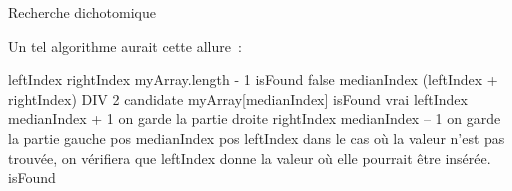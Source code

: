 \begin{Fiche}{Recherche dichotomique}
\begin{itemize}
		\end{itemize}

		Un tel algorithme aurait cette allure~:
	
		\begin{pseudocode}
				\Empty
				\Let leftIndex 
				\Let rightIndex \Gets myArray.length - 1
				\Let isFound \Gets false
				\Empty
					\Let medianIndex \Gets (leftIndex + rightIndex) DIV 2
					\Let candidate \Gets myArray[medianIndex]
						\Let isFound \Gets vrai
						\Let leftIndex \Gets medianIndex + 1
						\RComment on garde la partie droite
					\Else
						\Let rightIndex \Gets medianIndex – 1
						\RComment on garde la partie gauche
					\EndIf
				\EndWhile
				\Empty
					\Let pos \Gets medianIndex
				\Else
					\Let pos \Gets leftIndex
					\RComment dans le cas où la valeur n’est pas trouvée,
					\Empty 
					\RComment on vérifiera que leftIndex donne la valeur 
					où elle pourrait être insérée.
				\EndIf
				\Empty
				\Return isFound
			\EndAlgo
		\end{pseudocode}
\end{Fiche}
